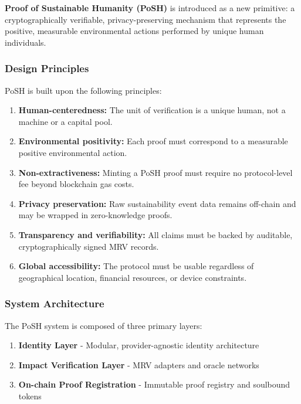 \documentclass{article}
\begin{document}
\textbf{Proof of Sustainable Humanity (PoSH)} is introduced as a new primitive: a cryptographically verifiable, privacy-preserving mechanism that represents the positive, measurable environmental actions performed by unique human individuals.

\subsubsection{Design Principles}

PoSH is built upon the following principles:

\begin{enumerate}
\item \textbf{Human-centeredness:} The unit of verification is a unique human, not a machine or a capital pool.
\item \textbf{Environmental positivity:} Each proof must correspond to a measurable positive environmental action.
\item \textbf{Non-extractiveness:} Minting a PoSH proof must require no protocol-level fee beyond blockchain gas costs.
\item \textbf{Privacy preservation:} Raw sustainability event data remains off-chain and may be wrapped in zero-knowledge proofs.
\item \textbf{Transparency and verifiability:} All claims must be backed by auditable, cryptographically signed MRV records.
\item \textbf{Global accessibility:} The protocol must be usable regardless of geographical location, financial resources, or device constraints.
\end{enumerate}

\subsubsection{System Architecture}

The PoSH system is composed of three primary layers:

\begin{enumerate}
\item \textbf{Identity Layer} - Modular, provider-agnostic identity architecture
\item \textbf{Impact Verification Layer} - MRV adapters and oracle networks
\item \textbf{On-chain Proof Registration} - Immutable proof registry and soulbound tokens
\end{enumerate}
\end{document}
